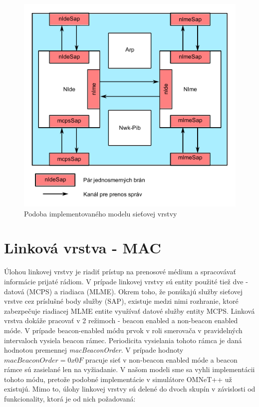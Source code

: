 \begin{figure}[htbp]
\begin{center}
\includegraphics[width=120mm]{figures/architecture_net}
\caption{Podoba implementovaného modelu sieťovej vrstvy}
\label{fig:architecture_net}
\end{center}
\end{figure}

\section{Linková vrstva - MAC}
\indent\indent Úlohou linkovej vrstvy je riadiť prístup na prenosové médium a spracovávať informácie prijaté rádiom. V prípade linkovej vrstvy sú entity použité tiež dve - datová (MCPS) a riadiaca (MLME). Okrem toho, že ponúkajú služby sieťovej vrstve cez príslušné body služby (SAP), existuje medzi nimi rozhranie, ktoré zabezpečuje riadiacej MLME entite využívať datové služby entity MCPS. Linková vrstva dokáže pracovať v 2 režimoch - beacon enabled a non-beacon enabled móde. V prípade beacon-enabled módu prvok v roli smerovača v pravidelných intervaloch vysiela beacon rámec. Periodicita vysielania tohoto rámca je daná hodnotou premennej \textit{macBeaconOrder}. V prípade hodnoty $macBeaconOrder = 0x0F$ pracuje sieť v non-beacon enabled móde a beacon rámce sú zasielané len na vyžiadanie. V našom modeli sme sa vyhli implementácii tohoto módu, pretože podobné implementácie v simulátore OMNeT++ už existujú. Mimo to, úlohy linkovej vrstvy sú delené do dvoch skupín v závislosti od funkcionality, ktorá je od nich požadovaná:

